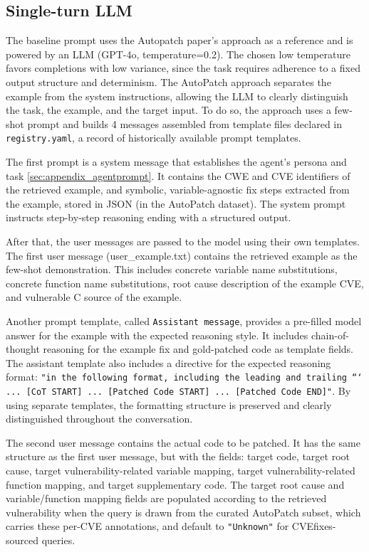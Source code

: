 \subsection{Single-turn LLM}

The baseline prompt uses the Autopatch paper's approach as a reference and is powered by an LLM (GPT-4o, temperature=0.2). 
The chosen low temperature favors completions with low variance, since the task requires adherence to a fixed output structure and determinism.
The AutoPatch approach separates the example from the system instructions, allowing the LLM to clearly distinguish the task, the example, and the target input. To do so, the approach uses a few-shot prompt and builds 4 messages assembled from template files declared in \texttt{registry.yaml}, a record of historically available prompt templates. 

The first prompt is a system message that establishes the agent's persona and task \ref{sec:appendix_agentprompt}. It contains the CWE and CVE identifiers of the retrieved example, and symbolic, variable-agnostic fix steps extracted from the example, stored in JSON (in the AutoPatch dataset).
The system prompt instructs step-by-step reasoning ending with a structured output. 

After that, the user messages are passed to the model using their own templates. The first user message (user\_example.txt) contains the retrieved example as the few-shot demonstration.
This includes concrete variable name substitutions, concrete function name substitutions, root cause description of the example CVE, and vulnerable C source of the example.

Another prompt template, called \texttt{Assistant message}, provides a pre-filled model answer for the example with the expected reasoning style. 
It includes chain-of-thought reasoning for the example fix and gold-patched code as template fields.
The assistant template also includes a directive for the expected reasoning format: \texttt{"in the following format, including the leading and trailing ``` ... [CoT START] ... [Patched Code START] ... [Patched Code END]"}. By using separate templates, the formatting structure is preserved and clearly distinguished throughout the conversation.

The second user message contains the actual code to be patched. 
It has the same structure as the first user message, but with the fields: target code, target root cause, target vulnerability-related variable mapping, target vulnerability-related function mapping, and target supplementary code.
The target root cause and variable/function mapping fields are populated according to the retrieved vulnerability when the query is drawn from the curated AutoPatch subset, which carries these per-CVE annotations, and default to \texttt{"Unknown"} for CVEfixes-sourced queries.

